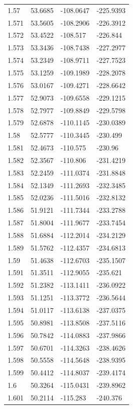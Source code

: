 \begin{tabular}{llll}
1.57 & 53.6685 & -108.0647 & -225.9393 \\
1.571 & 53.5605 & -108.2906 & -226.3912 \\
1.572 & 53.4522 & -108.517 & -226.844 \\
1.573 & 53.3436 & -108.7438 & -227.2977 \\
1.574 & 53.2349 & -108.9711 & -227.7523 \\
1.575 & 53.1259 & -109.1989 & -228.2078 \\
1.576 & 53.0167 & -109.4271 & -228.6642 \\
1.577 & 52.9073 & -109.6558 & -229.1215 \\
1.578 & 52.7977 & -109.8849 & -229.5798 \\
1.579 & 52.6878 & -110.1145 & -230.0389 \\
1.58 & 52.5777 & -110.3445 & -230.499 \\
1.581 & 52.4673 & -110.575 & -230.96 \\
1.582 & 52.3567 & -110.806 & -231.4219 \\
1.583 & 52.2459 & -111.0374 & -231.8848 \\
1.584 & 52.1349 & -111.2693 & -232.3485 \\
1.585 & 52.0236 & -111.5016 & -232.8132 \\
1.586 & 51.9121 & -111.7344 & -233.2788 \\
1.587 & 51.8004 & -111.9677 & -233.7454 \\
1.588 & 51.6884 & -112.2014 & -234.2129 \\
1.589 & 51.5762 & -112.4357 & -234.6813 \\
1.59 & 51.4638 & -112.6703 & -235.1507 \\
1.591 & 51.3511 & -112.9055 & -235.621 \\
1.592 & 51.2382 & -113.1411 & -236.0922 \\
1.593 & 51.1251 & -113.3772 & -236.5644 \\
1.594 & 51.0117 & -113.6138 & -237.0375 \\
1.595 & 50.8981 & -113.8508 & -237.5116 \\
1.596 & 50.7842 & -114.0883 & -237.9866 \\
1.597 & 50.6701 & -114.3263 & -238.4626 \\
1.598 & 50.5558 & -114.5648 & -238.9395 \\
1.599 & 50.4412 & -114.8037 & -239.4174 \\
1.6 & 50.3264 & -115.0431 & -239.8962 \\
1.601 & 50.2114 & -115.283 & -240.376 \\

\end{tabular}

